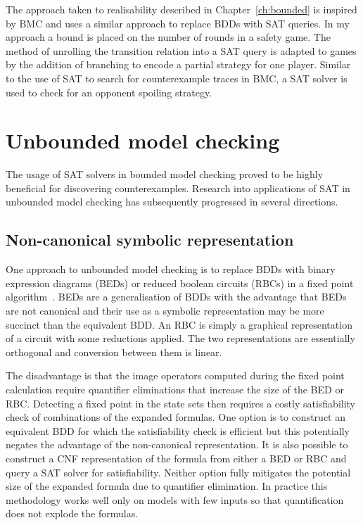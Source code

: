 The approach taken to realisability described in Chapter~\ref{ch:bounded} is inspired by BMC and uses a similar approach to replace BDDs with SAT queries. In my approach a bound is placed on the number of rounds in a safety game. The method of unrolling the transition relation into a SAT query is adapted to games by the addition of branching to encode a partial strategy for one player. Similar to the use of SAT to search for counterexample traces in BMC, a SAT solver is used to check for an opponent spoiling strategy.

\section{Unbounded model checking}

The usage of SAT solvers in bounded model checking proved to be highly beneficial for discovering counterexamples. Research into applications of SAT in unbounded model checking has subsequently progressed in several directions.

\subsection{Non-canonical symbolic representation}

One approach to unbounded model checking is to replace BDDs with binary expression diagrams (BEDs) or reduced boolean circuits (RBCs) in a fixed point algorithm~\cite{Williams00, Abdulla00}. BEDs are a generalisation of BDDs with the advantage that BEDs are not canonical and their use as a symbolic representation may be more succinct than the equivalent BDD. An RBC is simply a graphical representation of a circuit with some reductions applied. The two representations are essentially orthogonal and conversion between them is linear.

The disadvantage is that the image operators computed during the fixed point calculation require quantifier eliminations that increase the size of the BED or RBC. Detecting a fixed point in the state sets then requires a costly satisfiability check of combinations of the expanded formulas. One option is to construct an equivalent BDD for which the satisfiability check is efficient but this potentially negates the advantage of the non-canonical representation. It is also possible to construct a CNF representation of the formula from either a BED or RBC and query a SAT solver for satisfiability. Neither option fully mitigates the potential size of the expanded formula due to quantifier elimination. In practice this methodology works well only on models with few inputs so that quantification does not explode the formulas.

